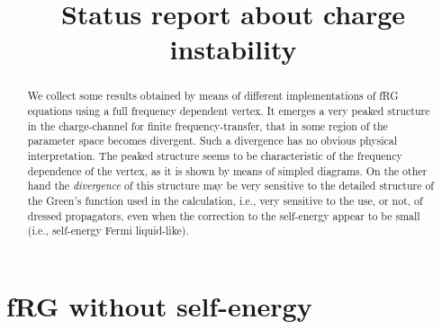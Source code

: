 \documentclass[a4paper,11pt]{article}
\begin{document}
\title{Status report about charge instability}

\maketitle 







\begin{abstract}

We collect some results obtained by means of different implementations of fRG equations using a full frequency dependent vertex. 
It emerges a very peaked structure in the charge-channel for finite frequency-transfer, that in some region of the parameter space becomes divergent. Such a divergence has no obvious physical interpretation.  
The peaked structure seems to be characteristic of the frequency dependence of the vertex, as it is shown by means of simpled diagrams. 
On the other hand the \emph{divergence} of this structure may be very sensitive to the detailed structure of the Green's function used in the calculation, i.e., very sensitive to the use, or not, of dressed propagators, even when the correction to the self-energy appear to be small (i.e., self-energy Fermi liquid-like).  

\end{abstract}

\maketitle

\section{fRG without self-energy} 				
\label{sec:frgnoself}
  





  
\end{document}
